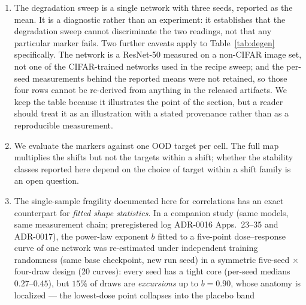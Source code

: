 \documentclass[10pt]{article}
\begin{document}
\begin{enumerate}
      implementation would sharpen the claim, and we regard it as the most
      valuable follow-up. A fourth cell
      (Section~\ref{sec:cell4}) narrows this gap from the protocol side: it
      holds the population and the solver fixed and varies only the host
      protocol around the solver, showing that the host protocol alone does
      not reproduce the radius flip but does perturb weak-marker rankings.
      Full separation -- holding everything fixed and swapping only the
      solver's numerical core -- still requires the reference solver's
      private internals, which remain unavailable; if access is granted the
      swap becomes a direct check.
\item The degradation sweep is a single network with three seeds, reported as
      the mean. It is a diagnostic rather than an experiment: it establishes
      that the degradation sweep cannot discriminate the two readings, not
      that any particular marker fails. Two further caveats apply to
      Table~\ref{tab:degen} specifically. The network is a ResNet-50 measured
      on a non-CIFAR image set, not one of the CIFAR-trained networks used in
      the recipe sweep; and the per-seed measurements behind the reported means
      were not retained, so those four rows cannot be re-derived from anything
      in the released artifacts. We keep the table because it illustrates the
      point of the section, but a reader should treat it as an illustration
      with a stated provenance rather than as a reproducible measurement.
\item We evaluate the markers against one OOD target per cell. The full map
      multiplies the shifts but not the targets within a shift; whether the
      stability classes reported here depend on the choice of target within a
      shift family is an open question.
\item The single-sample fragility documented here for correlations has an
      exact counterpart for \emph{fitted shape statistics}. In a companion
      study (same models, same measurement chain; preregistered log
      ADR-0016 Apps.~23--35 and ADR-0017), the power-law exponent $b$
      fitted to a five-point dose--response curve of one network was
      re-estimated under independent training randomness (same base
      checkpoint, new run seed) in a symmetric five-seed $\times$
      four-draw design (20 curves): every seed has a tight core
      (per-seed medians $0.27$--$0.45$), but $15\%$ of draws are
      \emph{excursions} up to $b=0.90$, whose anatomy is localized
      --- the lowest-dose point collapses into the placebo band

\end{enumerate}
\end{document}
